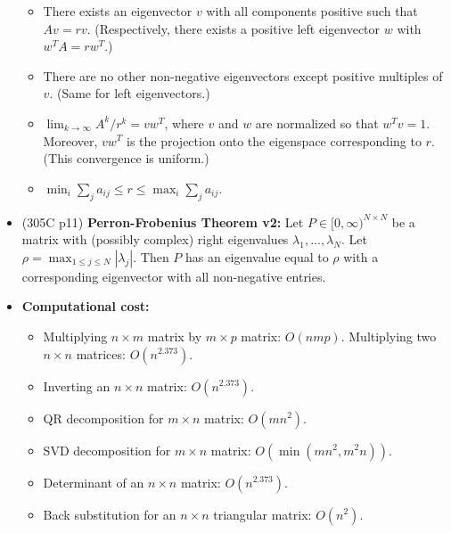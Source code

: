 \documentclass[twoside]{article}
\newcommand{\dis}{\displaystyle}
\newcommand\lmb{\lambda}
\newcommand\goesto{\rightarrow}
\begin{document}
\begin{itemize}
\begin{itemize}
\item There exists an eigenvector $v$ with all components positive such that $Av = rv$. (Respectively, there exists a positive left eigenvector $w$ with $w^T A = rw^T$.)

\item There are no other non-negative eigenvectors except positive multiples of $v$. (Same for left eigenvectors.)

\item $\dis\lim_{k \goesto \infty}A^k/r^k = vw^T$, where $v$ and $w$ are normalized so that $w^T v = 1$. Moreover, $vw^T$ is the projection onto the eigenspace corresponding to $r$. (This convergence is uniform.)

\item $\dis\min_i \sum_j a_{ij} \leq r \leq \max_i \sum_j a_{ij}$.
\end{itemize}

\item (305C p11) \textbf{Perron-Frobenius Theorem v2:} Let $P \in [0, \infty)^{N \times N}$ be a matrix with (possibly complex) right eigenvalues $\lmb_1, \dots, \lmb_N$. Let $\rho = \dis\max_{1 \leq j \leq N} |\lmb_j|$. Then $P$ has an eigenvalue equal to $\rho$ with a corresponding eigenvector with all non-negative entries.

\item \textbf{Computational cost:}
\begin{itemize}
\item Multiplying $n \times m$ matrix by $m \times p$ matrix: $O(nmp)$. Multiplying two $n \times n$ matrices: $O(n^{2.373})$.

\item Inverting an $n \times n$ matrix: $O(n^{2.373})$.

\item QR decomposition for $m \times n$ matrix: $O(mn^2)$.

\item SVD decomposition for $m \times n$ matrix: $O(\min (mn^2, m^2n))$.

\item Determinant of an $n \times n$ matrix: $O(n^{2.373})$.

\item Back substitution for an $n \times n$ triangular matrix: $O(n^2)$.
\end{itemize}

\end{itemize}
\end{document}
